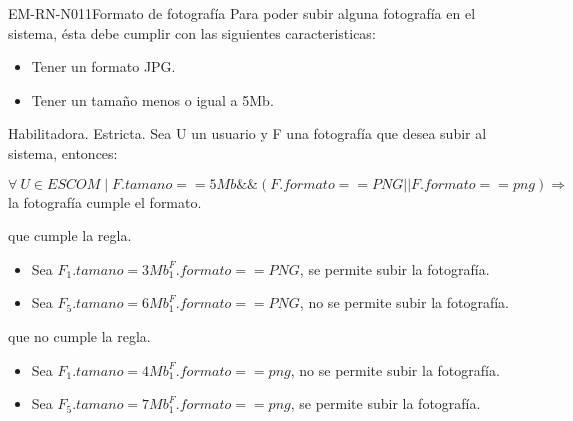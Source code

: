 \begin{BussinesRule}{EM-RN-N011}{Formato de fotografía}
	\BRitem[Descripción:] Para poder subir alguna fotografía en el sistema, ésta debe
	cumplir con las siguientes caracteristicas: 
		\begin{itemize}
			\item Tener un formato JPG. 
			\item Tener un tamaño menos o igual a 5Mb.
		\end{itemize}
	\BRitem[Tipo: ] Habilitadora.
	\BRitem[Nivel: ] Estricta.
	\BRitem[Sentenia: ] Sea U un usuario y F una 
	fotografía que desea subir al sistema, entonces:
	\begin{center}
		$\forall \: U \in ESCOM \mid F.tamano == 5Mb \&\& (F.formato == PNG || F.formato == png) \Rightarrow$ la fotografía cumple el formato.
	\end{center}
	 que cumple la regla.
		\begin{itemize}
			\item Sea $F_{1}.tamano = 3Mb ^ F_{1}.formato == PNG$, se permite
			subir la fotografía.
			\item Sea $F_{5}.tamano = 6Mb ^ F_{1}.formato == PNG$, no se permite
			subir la fotografía.
		\end{itemize}
	 que no cumple la regla.
		\begin{itemize}
			\item Sea $F_{1}.tamano = 4Mb ^ F_{1}.formato == png$, no se permite
			subir la fotografía.
			\item Sea $F_{5}.tamano = 7Mb ^ F_{1}.formato == png$, se permite
			subir la fotografía.
		\end{itemize}

\end{BussinesRule}



